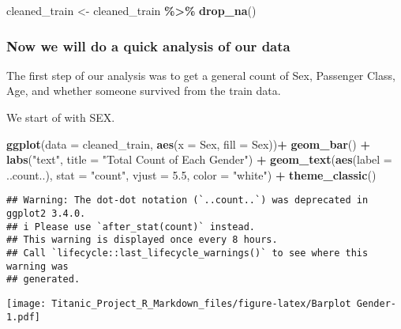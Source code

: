 \documentclass[
]{article}
\newenvironment{Shaded}{\begin{snugshade}}{\end{snugshade}}
\newcommand{\AttributeTok}[1]{\textcolor[rgb]{0.13,0.29,0.53}{#1}}
\newcommand{\FloatTok}[1]{\textcolor[rgb]{0.00,0.00,0.81}{#1}}
\newcommand{\FunctionTok}[1]{\textcolor[rgb]{0.13,0.29,0.53}{\textbf{#1}}}
\newcommand{\NormalTok}[1]{#1}
\newcommand{\OtherTok}[1]{\textcolor[rgb]{0.56,0.35,0.01}{#1}}
\newcommand{\SpecialCharTok}[1]{\textcolor[rgb]{0.81,0.36,0.00}{\textbf{#1}}}
\newcommand{\StringTok}[1]{\textcolor[rgb]{0.31,0.60,0.02}{#1}}
\begin{document}
\begin{Shaded}
\begin{Highlighting}[]
\NormalTok{cleaned\_train }\OtherTok{\textless{}{-}}\NormalTok{ cleaned\_train }\SpecialCharTok{\%\textgreater{}\%} 
  \FunctionTok{drop\_na}\NormalTok{()}
\end{Highlighting}
\end{Shaded}

\hypertarget{now-we-will-do-a-quick-analysis-of-our-data}{%
\subsubsection{\texorpdfstring{\textbf{Now we will do a quick analysis
of our
data}}{Now we will do a quick analysis of our data}}\label{now-we-will-do-a-quick-analysis-of-our-data}}

The first step of our analysis was to get a general count of Sex,
Passenger Class, Age, and whether someone survived from the train data.

We start of with SEX.

\begin{Shaded}
\begin{Highlighting}[]
\FunctionTok{ggplot}\NormalTok{(}\AttributeTok{data =}\NormalTok{ cleaned\_train, }\FunctionTok{aes}\NormalTok{(}\AttributeTok{x =}\NormalTok{ Sex, }\AttributeTok{fill =}\NormalTok{ Sex))}\SpecialCharTok{+} 
  \FunctionTok{geom\_bar}\NormalTok{() }\SpecialCharTok{+} 
  \FunctionTok{labs}\NormalTok{(}\StringTok{"text"}\NormalTok{, }\AttributeTok{title =} \StringTok{"Total Count of Each Gender"}\NormalTok{) }\SpecialCharTok{+}
  \FunctionTok{geom\_text}\NormalTok{(}\FunctionTok{aes}\NormalTok{(}\AttributeTok{label =}\NormalTok{ ..count..), }\AttributeTok{stat =} \StringTok{"count"}\NormalTok{, }\AttributeTok{vjust =} \FloatTok{5.5}\NormalTok{, }\AttributeTok{color =} \StringTok{"white"}\NormalTok{) }\SpecialCharTok{+}
  \FunctionTok{theme\_classic}\NormalTok{()}
\end{Highlighting}
\end{Shaded}

\begin{verbatim}
## Warning: The dot-dot notation (`..count..`) was deprecated in ggplot2 3.4.0.
## i Please use `after_stat(count)` instead.
## This warning is displayed once every 8 hours.
## Call `lifecycle::last_lifecycle_warnings()` to see where this warning was
## generated.
\end{verbatim}

\texttt{[image: Titanic\_Project\_R\_Markdown\_files/figure-latex/Barplot Gender-1.pdf]}
\end{document}
